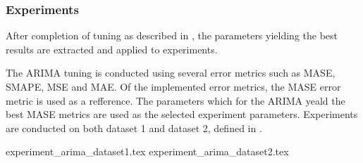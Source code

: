 \subsubsection{Experiments}

After completion of tuning as described in ,
the parameters yielding the best results are extracted and applied to experiments.

The ARIMA tuning is conducted using several error metrics such as MASE, SMAPE, MSE and MAE.
Of the implemented error metrics, the MASE error metric is used as a refference.
The parameters which for the ARIMA yeald the best MASE metrics are used as the selected experiment parameters.
Experiments are conducted on both dataset 1 and dataset 2, defined in .


{experiment_arima_dataset1.tex}
{experiment_arima_dataset2.tex}

